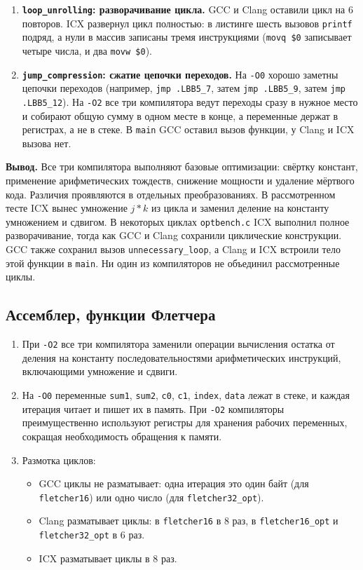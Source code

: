 \documentclass[a4paper]{article}
\begin{document}
\begin{enumerate}
    \item \textbf{\texttt{loop\_unrolling}: разворачивание цикла.} GCC и Clang оставили цикл на 6 повторов. ICX развернул цикл полностью: в листинге шесть вызовов \texttt{printf} подряд, а нули в массив записаны тремя инструкциями (\texttt{movq \$0} записывает четыре числа, и два \texttt{movw \$0}).
    \item \textbf{\texttt{jump\_compression}: сжатие цепочки переходов.} На \texttt{-O0} хорошо заметны цепочки переходов (например, \texttt{jmp .LBB5\_7}, затем \texttt{jmp .LBB5\_9}, затем \texttt{jmp .LBB5\_12}). На \texttt{-O2} все три компилятора ведут переходы сразу в нужное место и собирают общую сумму в одном месте в конце, а переменные держат в регистрах, а не в стеке. В \texttt{main} GCC оставил вызов функции, у Clang и ICX вызова нет.
\end{enumerate}

\textbf{Вывод.} Все три компилятора выполняют базовые оптимизации: свёртку констант, применение арифметических тождеств, снижение мощности и удаление мёртвого кода. Различия проявляются в отдельных преобразованиях. В рассмотренном тесте ICX вынес умножение \(j * k\) из цикла и заменил деление на константу умножением и сдвигом. В некоторых циклах \texttt{optbench.c} ICX выполнил полное разворачивание, тогда как GCC и Clang сохранили циклические конструкции. GCC также сохранил вызов \texttt{unnecessary\_loop}, а Clang и ICX встроили тело этой функции в \texttt{main}. Ни один из компиляторов не объединил рассмотренные циклы.

\subsection{Ассемблер, функции Флетчера}

\begin{enumerate}
    \item При \texttt{-O2} все три компилятора заменили операции вычисления остатка от деления на константу последовательностями арифметических инструкций, включающими умножение и сдвиги.
    \item На \texttt{-O0} переменные \texttt{sum1}, \texttt{sum2}, \texttt{c0}, \texttt{c1}, \texttt{index}, \texttt{data} лежат в стеке, и каждая итерация читает и пишет их в память. При \texttt{-O2} компиляторы преимущественно используют регистры для хранения рабочих переменных, сокращая необходимость обращения к памяти.
    \item Размотка циклов:
    \begin{itemize}
        \item GCC циклы не разматывает: одна итерация это один байт (для \texttt{fletcher16}) или одно число (для \texttt{fletcher32\_opt}).
        \item Clang разматывает циклы: в \texttt{fletcher16} в 8 раз, в \texttt{fletcher16\_opt} и \texttt{fletcher32\_opt} в 6 раз.
        \item ICX разматывает циклы в 8 раз.
    \end{itemize}
\end{enumerate}
\end{document}
